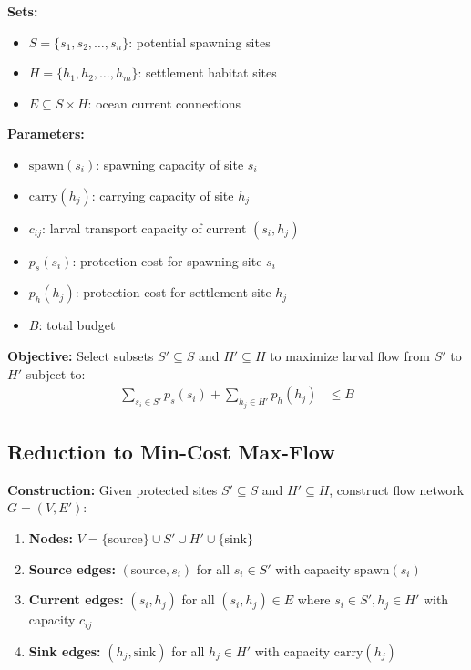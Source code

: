 \documentclass[sigconf,nonacm]{acmart}
\begin{document}
\textbf{Sets:}
\begin{itemize}
    \item $S = \{s_1, s_2, \ldots, s_n\}$: potential spawning sites
    \item $H = \{h_1, h_2, \ldots, h_m\}$: settlement habitat sites
    \item $E \subseteq S \times H$: ocean current connections
\end{itemize}

\textbf{Parameters:}
\begin{itemize}
    \item $\text{spawn}(s_i)$: spawning capacity of site $s_i$
    \item $\text{carry}(h_j)$: carrying capacity of site $h_j$
    \item $c_{ij}$: larval transport capacity of current $(s_i, h_j)$
    \item $p_s(s_i)$: protection cost for spawning site $s_i$
    \item $p_h(h_j)$: protection cost for settlement site $h_j$
    \item $B$: total budget
\end{itemize}

\textbf{Objective:} Select subsets $S' \subseteq S$ and $H' \subseteq H$ to maximize larval flow from $S'$ to $H'$ subject to:
\begin{align}
    \sum_{s_i \in S'} p_s(s_i) + \sum_{h_j \in H'} p_h(h_j) &\leq B
\end{align}

\subsection{Reduction to Min-Cost Max-Flow}

\textbf{Construction:} Given protected sites $S' \subseteq S$ and $H' \subseteq H$, construct flow network $G = (V, E')$:

\begin{enumerate}
    \item \textbf{Nodes:} $V = \{\text{source}\} \cup S' \cup H' \cup \{\text{sink}\}$
    \item \textbf{Source edges:} $(\text{source}, s_i)$ for all $s_i \in S'$ with capacity $\text{spawn}(s_i)$
    \item \textbf{Current edges:} $(s_i, h_j)$ for all $(s_i, h_j) \in E$ where $s_i \in S', h_j \in H'$ with capacity $c_{ij}$
    \item \textbf{Sink edges:} $(h_j, \text{sink})$ for all $h_j \in H'$ with capacity $\text{carry}(h_j)$
\end{enumerate}
\end{document}

